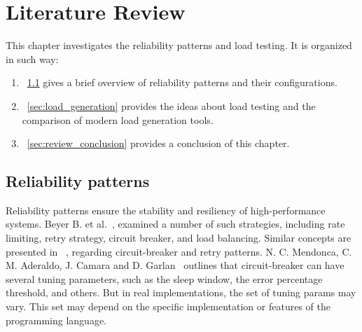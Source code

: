\chapter{Literature Review}
\label{ch:lr}

This chapter investigates the reliability patterns and load testing.
It is organized in such way:
\begin{enumerate}
    \item~\ref{sec:reliability} gives a brief overview of reliability patterns and their configurations.
    \item~\ref{sec:load_generation} provides the ideas about load testing and the comparison of modern load generation tools.
    \item~\ref{sec:review_conclusion} provides a conclusion of this chapter.
\end{enumerate}


\section{Reliability patterns}\label{sec:reliability}
Reliability patterns ensure the stability and resiliency of high-performance systems.
Beyer B. et al.~\cite{google_sre}, examined a number of such strategies, including rate limiting, retry strategy, circuit breaker, and load balancing. Similar concepts are presented in ~\cite{reliability_patterns}, regarding circuit-breaker and retry patterns.
N. C. Mendonca, C. M. Aderaldo, J. Camara and D. Garlan~\cite{circuit_breaker} outlines that circuit-breaker can have several tuning parameters, such as the sleep window, the error percentage threshold, and others. But in real implementations, the set of tuning params may vary. This set may depend on the specific implementation or features of the programming language.

